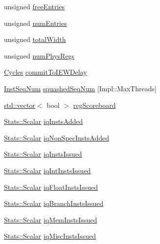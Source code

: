 \begin{DoxyCompactItemize}
\item 
unsigned \hyperlink{classInstructionQueue_ac2281ff630f82397bda33269f4ee8796}{freeEntries}
\item 
unsigned \hyperlink{classInstructionQueue_a325de474a9f6652329339d9fc2ea09c0}{numEntries}
\item 
unsigned \hyperlink{classInstructionQueue_ab3c3a8cd00248d9cd6acad330da902a7}{totalWidth}
\item 
unsigned \hyperlink{classInstructionQueue_a0d2a78a8e887f06150904000b2beb6cd}{numPhysRegs}
\item 
\hyperlink{classCycles}{Cycles} \hyperlink{classInstructionQueue_a6b6fe1148ed7c40758e45f351c375552}{commitToIEWDelay}
\item 
\hyperlink{inst__seq_8hh_a258d93d98edaedee089435c19ea2ea2e}{InstSeqNum} \hyperlink{classInstructionQueue_a97d5a7e4630ad1d017909f7504b9ec32}{squashedSeqNum} \mbox{[}Impl::MaxThreads\mbox{]}
\item 
\hyperlink{classstd_1_1vector}{std::vector}$<$ bool $>$ \hyperlink{classInstructionQueue_a61aeb86b87d1e105337b5a8973ce61f3}{regScoreboard}
\item 
\hyperlink{classStats_1_1Scalar}{Stats::Scalar} \hyperlink{classInstructionQueue_a435e1ce10c3a7f54a60941e583adeb09}{iqInstsAdded}
\item 
\hyperlink{classStats_1_1Scalar}{Stats::Scalar} \hyperlink{classInstructionQueue_adf890a08fae50ea8249171b07c40adac}{iqNonSpecInstsAdded}
\item 
\hyperlink{classStats_1_1Scalar}{Stats::Scalar} \hyperlink{classInstructionQueue_accc6261a817718dbb727c65f310df357}{iqInstsIssued}
\item 
\hyperlink{classStats_1_1Scalar}{Stats::Scalar} \hyperlink{classInstructionQueue_a735f2023e70e53b7889a3a316bd3d57f}{iqIntInstsIssued}
\item 
\hyperlink{classStats_1_1Scalar}{Stats::Scalar} \hyperlink{classInstructionQueue_aa9f2fa124c9f0b4b22461b6717449d9a}{iqFloatInstsIssued}
\item 
\hyperlink{classStats_1_1Scalar}{Stats::Scalar} \hyperlink{classInstructionQueue_a928f22a2c6ce592adc40e5242c9d6572}{iqBranchInstsIssued}
\item 
\hyperlink{classStats_1_1Scalar}{Stats::Scalar} \hyperlink{classInstructionQueue_a5e7d55d3f07e86e389ca3a715766e108}{iqMemInstsIssued}
\item 
\hyperlink{classStats_1_1Scalar}{Stats::Scalar} \hyperlink{classInstructionQueue_ad234890bc414fffe7ed71840c51be5cb}{iqMiscInstsIssued}
\item 

\end{DoxyCompactItemize}
